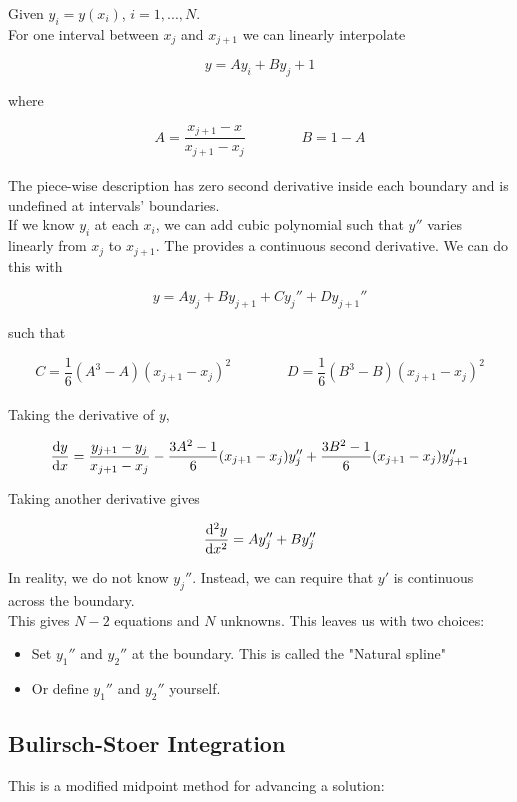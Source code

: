 \documentclass[]{article}
\begin{document}
Given $y_i=y(x_i)$, $i=1, ..., N$.\\

For one interval between $x_j$ and $x_{j+1}$ we can linearly interpolate

\[y = Ay_i + By_{j}+1\]

where

\[A = \frac{x_{j+1}-x}{x_{j+1} - x_j} \qquad\qquad B =1-A\]\\

The piece-wise description has zero second derivative inside each boundary and is undefined at intervals' boundaries.\\

If we know $y_i$ at each $x_i$, we can add cubic polynomial such that $y''$ varies linearly from $x_j$ to $x_{j+1}$. The provides a continuous second derivative. We can do this with 

\[y = Ay_j + By_{j+1} + Cy_j'' + Dy_{j+1}''\]

such that

\[C = \frac{1}{6} (A^3 - A)(x_{j+1} - x_j)^2 \qquad\qquad D = \frac{1}{6} (B^3 - B)(x_{j+1} - x_j)^2\]\\

Taking the derivative of $y$, 

\[\dv{y}{x} = \frac{y_{j+1} - y_j}{x_{j+1} - x_j} - \frac{3A^2 - 1}{6}(x_{j+1} - x_j)y_{j}'' + \frac{3B^2-1}{6}(x_{j+1} - x_j)y_{j+1}''\]\bigbreak

Taking another derivative gives

\[\dv[2]{y}{x} = Ay_j'' + By_j''\]\bigbreak

In reality, we do not know $y_j''$. Instead, we can require that $y'$ is continuous across the boundary.\\

This gives $N-2$ equations and $N$ unknowns. This leaves us with two choices:

\begin{itemize}
	\item Set $y_1''$ and $y_2''$ at the boundary. This is called the "Natural spline"
	\item Or define $y_1''$ and $y_2''$ yourself.
\end{itemize}\bigbreak

\subsection{Bulirsch-Stoer Integration}\bigbreak

This is a modified midpoint method for advancing a solution: 
\end{document}
